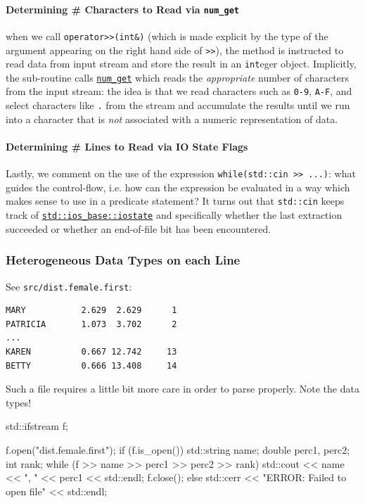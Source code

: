 \documentclass[12pt,letterpaper,twoside]{article}
\begin{document}
\paragraph{Determining \# Characters to Read via \texttt{num\_get}}
when we call \texttt{operator>>(int\&)} (which is made explicit by the type of the argument appearing on the right hand side of \texttt{>>}), 
the method is instructed to read data
from input stream and store the result in an \texttt{int}eger object. Implicitly, the 
sub-routine calls \href{https://en.cppreference.com/w/cpp/locale/num_get/get}
{\texttt{num\_get}} which reads the \emph{appropriate} number of characters from the input 
stream: the idea is that we read characters such as \texttt{0-9}, \texttt{A-F}, and select characters like \texttt{.} from the stream and 
accumulate the results until we run into a character that is \emph{not} associated with
a numeric representation of data.

\paragraph{Determining \# Lines to Read via IO State Flags} Lastly, we comment
on the use of the expression \texttt{while(std::cin >> ...)}: what guides the control-flow,
i.e. how can the expression be evaluated in a way which makes sense to use in a predicate
statement? It turns out that \texttt{std::cin} keeps track of 
\href{https://en.cppreference.com/w/cpp/io/ios_base/iostate}
{\texttt{std::ios\_base::iostate}} and specifically whether the last extraction succeeded
or whether an end-of-file bit has been encountered.

\subsubsection{Heterogeneous Data Types on each Line}
See \texttt{src/dist.female.first}:

{\small
\begin{verbatim}
MARY           2.629  2.629      1
PATRICIA       1.073  3.702      2
...
KAREN          0.667 12.742     13
BETTY          0.666 13.408     14
\end{verbatim}
}
Such a file requires a little bit more care in order to parse properly. Note the data types!

\begin{cpp}
std::ifstream f;

f.open("dist.female.first");
if (f.is_open()) {
  std::string name;
  double perc1, perc2;
  int rank;
  while (f >> name >> perc1 >> perc2 >> rank) {
    std::cout << name << ", " << perc1 << std::endl;
  }
  f.close();
}
else { std::cerr << "ERROR: Failed to open file" << std::endl; }
\end{cpp}
\end{document}
